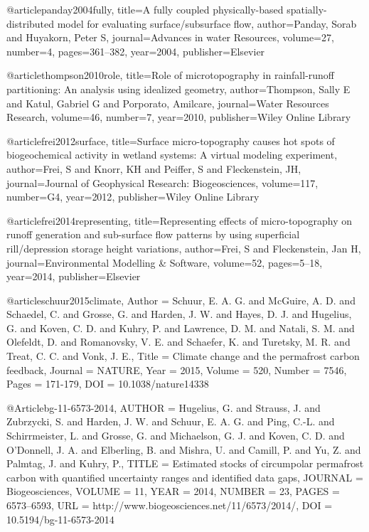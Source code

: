 \begin{thebibliography}{}
@article{panday2004fully,
  title={A fully coupled physically-based spatially-distributed model for evaluating surface/subsurface flow},
  author={Panday, Sorab and Huyakorn, Peter S},
  journal={Advances in water Resources},
  volume={27},
  number={4},
  pages={361--382},
  year={2004},
  publisher={Elsevier}
}

@article{thompson2010role,
  title={Role of microtopography in rainfall-runoff partitioning: An analysis using idealized geometry},
  author={Thompson, Sally E and Katul, Gabriel G and Porporato, Amilcare},
  journal={Water Resources Research},
  volume={46},
  number={7},
  year={2010},
  publisher={Wiley Online Library}
}

@article{frei2012surface,
  title={Surface micro-topography causes hot spots of biogeochemical activity in wetland systems: A virtual modeling experiment},
  author={Frei, S and Knorr, KH and Peiffer, S and Fleckenstein, JH},
  journal={Journal of Geophysical Research: Biogeosciences},
  volume={117},
  number={G4},
  year={2012},
  publisher={Wiley Online Library}
}

@article{frei2014representing,
  title={Representing effects of micro-topography on runoff generation and sub-surface flow patterns by using superficial rill/depression storage height variations},
  author={Frei, S and Fleckenstein, Jan H},
  journal={Environmental Modelling \& Software},
  volume={52},
  pages={5--18},
  year={2014},
  publisher={Elsevier}
}

@article{schuur2015climate,
Author = {Schuur, E. A. G. and McGuire, A. D. and Schaedel, C. and Grosse, G. and
   Harden, J. W. and Hayes, D. J. and Hugelius, G. and Koven, C. D. and
   Kuhry, P. and Lawrence, D. M. and Natali, S. M. and Olefeldt, D. and
   Romanovsky, V. E. and Schaefer, K. and Turetsky, M. R. and Treat, C. C.
   and Vonk, J. E.},
Title = {{Climate change and the permafrost carbon feedback}},
Journal = {{NATURE}},
Year = {{2015}},
Volume = {{520}},
Number = {{7546}},
Pages = {{171-179}},
DOI = {{10.1038/nature14338}}
}


@Article{bg-11-6573-2014,
AUTHOR = {Hugelius, G. and Strauss, J. and Zubrzycki, S. and Harden, J. W. and Schuur, E. A. G. and Ping, C.-L. and Schirrmeister, L. and Grosse, G. and Michaelson, G. J. and Koven, C. D. and O'Donnell, J. A. and Elberling, B. and Mishra, U. and Camill, P. and Yu, Z. and Palmtag, J. and Kuhry, P.},
TITLE = {Estimated stocks of circumpolar permafrost carbon with quantified  uncertainty ranges and identified data gaps},
JOURNAL = {Biogeosciences},
VOLUME = {11},
YEAR = {2014},
NUMBER = {23},
PAGES = {6573--6593},
URL = {http://www.biogeosciences.net/11/6573/2014/},
DOI = {10.5194/bg-11-6573-2014}
}


\end{thebibliography}
